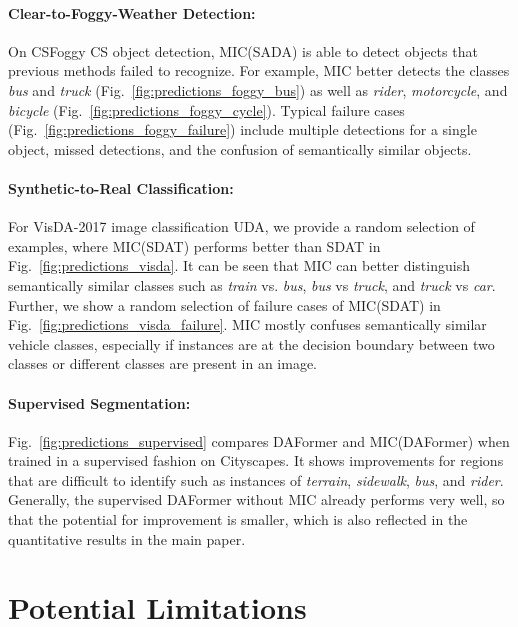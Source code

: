 \documentclass[10pt,twocolumn,letterpaper]{article}
\begin{document}
\paragraph{Clear-to-Foggy-Weather Detection:}
On CSFoggy CS object detection, MIC(SADA) is able to detect objects that previous methods failed to recognize. For example, MIC better detects the classes \emph{bus} and \emph{truck} (Fig.~\ref{fig:predictions_foggy_bus}) as well as \emph{rider}, \emph{motorcycle}, and \emph{bicycle} (Fig.~\ref{fig:predictions_foggy_cycle}). Typical failure cases (Fig.~\ref{fig:predictions_foggy_failure}) include multiple detections for a single object, missed detections, and the confusion of semantically similar objects.

\paragraph{Synthetic-to-Real Classification:}
For VisDA-2017 image classification UDA, we provide a random selection of examples, where MIC(SDAT) performs better than SDAT in Fig.~\ref{fig:predictions_visda}. It can be seen that MIC can better distinguish semantically similar classes such as \emph{train} vs. \emph{bus}, \emph{bus} vs \emph{truck}, and \emph{truck} vs \emph{car}. Further, we show a random selection of failure cases of MIC(SDAT) in Fig.~\ref{fig:predictions_visda_failure}. MIC mostly confuses semantically similar vehicle classes, especially if instances are at the decision boundary between two classes or different classes are present in an image.

\paragraph{Supervised Segmentation:}
Fig.~\ref{fig:predictions_supervised} compares DAFormer and MIC(DAFormer) when trained in a supervised fashion on Cityscapes. It shows improvements for regions that are difficult to identify such as instances of \emph{terrain}, \emph{sidewalk}, \emph{bus}, and \emph{rider}. Generally, the supervised DAFormer without MIC already performs very well, so that the potential for improvement is smaller, which is also reflected in the quantitative results in the main paper.


\section{Potential Limitations}
\label{sec:supp_limitations}
\end{document}
